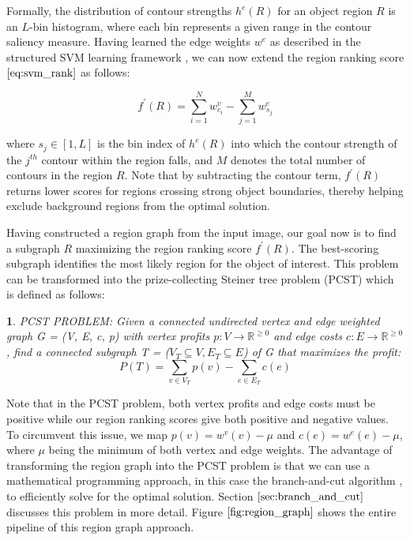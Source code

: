 \documentclass{SMBV12}
\newtheorem{definition}{}
\begin{document}
Formally, the distribution of contour strengths $h^e(R)$ for an object region $R$ is an $L$-bin histogram, where each bin represents a given range in the contour saliency measure. Having learned the edge weights $w^e$ as described in the structured SVM learning framework \cite{tsochantaridis2006large}, we can now extend the region ranking score $\ref{eq:svm_rank}$ as follows:

\begin{equation}
f^{\prime}(R) = \sum\limits_{i = 1}^{N} w^v_{c_i} - \sum\limits_{j = 1}^{M} w^e_{s_j}
\end{equation}

where $s_j \in [1, L]$ is the bin index of $h^e(R)$ into which the contour strength of the $j^{th}$ contour within the region falls, and $M$ denotes the total number of contours in the region $R$. Note that by subtracting the contour term, $f^{\prime}(R)$ returns lower scores for regions crossing strong object boundaries, thereby helping exclude background regions from the optimal solution.

Having constructed a region graph from the input image, our goal now is to find a subgraph $R$ maximizing the region ranking score $f^\prime(R)$. The best-scoring subgraph identifies the most likely region for the object of interest. This problem can be transformed into the prize-collecting Steiner tree problem (PCST) which is defined as follows:

\begin{definition}
PCST PROBLEM: Given a connected undirected vertex and edge weighted graph G = (V, E, c, p) with vertex profits $p: V \rightarrow \mathbb{R}^{\geq 0}$ and edge costs $c: E \rightarrow \mathbb{R}^{\geq 0}$, find a connected subgraph T = ($V_T \subseteq V, E_T \subseteq E$) of G that maximizes the profit:
\begin{equation}
P(T) = \sum\limits_{v \in V_T} p(v) - \sum\limits_{e \in E_T} c(e)
\end{equation}
\end{definition}

Note that in the PCST problem, both vertex profits and edge costs must be positive while our region ranking scores give both positive and negative values. To circumvent this issue, we map $p(v) = w^v(v) - \mu$ and $c(e) = w^e(e) - \mu$, where $\mu$ being the minimum of both vertex and edge weights. The advantage of transforming the region graph into the PCST problem is that we can use a mathematical programming approach, in this case the branch-and-cut algorithm \cite{ljubic2006algorithmic}, to efficiently solve for the optimal solution. Section $\ref{sec:branch_and_cut}$ discusses this problem in more detail. Figure $\ref{fig:region_graph}$ shows the entire pipeline of this region graph approach.
\end{document}
